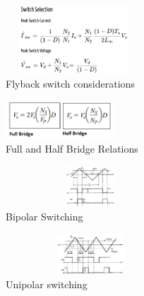 \documentclass[twocolumn]{article}
\begin{document}
  \begin{figure}[!ht]
	\includegraphics[width=2in,height=1in]{flybak_switch}
	\caption{Flyback switch considerations}
\end{figure}

\begin{figure}[!ht]
	\includegraphics[width=1.6in,height=.6in]{fullandhalfinout.png}
	\caption{Full and Half Bridge Relations}
\end{figure}

\begin{figure}[!ht]
	\includegraphics[width=2.5in,height=0.6in]{bipolar1.png}
	\caption{Bipolar Switching}
\end{figure}

\begin{figure}[!ht]
	\includegraphics[width=2.5in,height=0.6in]{unipolar1.png}
	\caption{Unipolar switching}
\end{figure}




\end{document}
